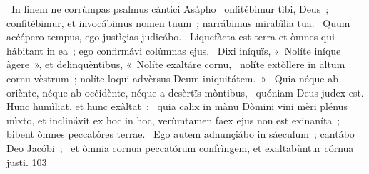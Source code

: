 {~In finem ne corrùmpas psalmus càntici Asápho}
{%
~onfitébimur tìbi, Deus~; confitébimur, et invocábimus nomen tuum~; narrábimus mirabìlia tua.
~Quum acċépero tempus, ego justìçias judicábo.
~Liquefàcta est terra et òmnes qui hábitant in ea~; ego confirmávi colùmnas ejus.
~Dixi iníquïs, «~Nolíte iníque àgere~», et delinquèntibus, «~Nolíte exaltáre cornu,
~nolíte extòllere in altum cornu vèstrum~; nolíte loqui advèrsus Deum iniquitátem.~»
~Quia néque ab oriènte, néque ab ocċidènte, néque a desèrtïs mòntibus,
~quóniam Deus judex est. Hunc humìliat, et hunc exàltat~;
~quia calix in mànu Dòmini vini mèri plénus mìxto, et inclinávit ex hoc in hoc, verùmtamen faex ejus non est exinaníta~; bibent òmnes peccatóres terrae.
~Ego autem adnunçiábo in sáeculum~; cantábo Deo Jacóbi~;
~et òmnia cornua peccatórum confrìngem, et exaltabùntur córnua justi.
}
{10}{3}
